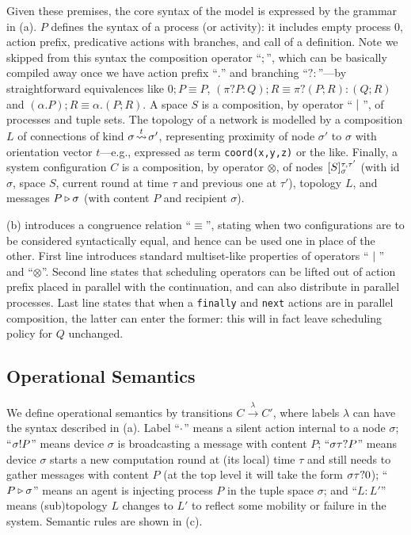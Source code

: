 \documentclass[12pt,a4paper,twoside,openright]{book}
\begin{document}
Given these premises, the core syntax of the model is expressed by the grammar in  (a). $P$ defines the syntax of a process (or activity): it includes empty process $0$, action prefix, predicative actions with branches, and call of a definition.
%
Note we skipped from this syntax the composition operator ``$;$'', which can be basically compiled away once we have action prefix ``$.$'' and branching ``$?:$''---by straightforward equivalences like $0;P\equiv P$, $(\pi?P:Q);R \equiv \pi?(P;R):(Q;R)$ and $(\alpha.P);R \equiv \alpha.(P;R)$.
%
A space $S$ is a composition, by operator ``$\opar$'', of processes and tuple sets.
%
The topology of a network is modelled by a composition $L$ of connections of kind $\near{\sigma}{\sigma'}{t}$, representing proximity of node $\sigma'$ to $\sigma$ with orientation vector $t$---e.g., expressed as term \texttt{coord(x,y,z)} or the like.
%
Finally, a system configuration $C$ is a composition, by operator $\otimes$, of nodes $\scope{S}{\sigma}{\tau,\tau'}$ (with id $\sigma$, space $S$, current round at time $\tau$ and previous one at $\tau'$), topology $L$, and messages $\mesg{P}{\sigma}$ (with content $P$ and recipient $\sigma$).

 (b) introduces a congruence relation ``$\equiv$'', stating when two configurations are to be considered syntactically equal, and hence can be used one in place of the other.
%
First line introduces standard multiset-like properties of operators ``$\opar$'' and ``$\otimes$''.
%
Second line states that scheduling operators can be lifted out of action prefix placed in parallel with the continuation, and can also distribute in parallel processes.
%
Last line states that when a \texttt{finally} and \texttt{next} actions are in parallel composition, the latter can enter the former: this will in fact leave scheduling policy for $Q$ unchanged.

\subsection{Operational Semantics}

We define operational semantics by transitions $C\xrightarrow{\lambda}C'$, where labels $\lambda$ can have the syntax described in  (a).
%
Label ``$\labsilent{\sigma}$'' means a silent action internal to a node $\sigma$; ``$\labmesg{\sigma}{P}$'' means device $\sigma$ is broadcasting a message with content $P$; ``$\labnew{\tau}{P}{\sigma}$'' means device $\sigma$ starts a new computation round at (its local) time $\tau$ and still needs to gather messages with content $P$ (at the top level it will take the form $\labnew{\tau}{0}{\sigma}$); ``$\mesg{P}{\sigma}$'' means an agent is injecting process $P$ in the tuple space $\sigma$; and ``$L:L'$'' means (sub)topology $L$ changes to $L'$ to reflect some mobility or failure in the system.
%
Semantic rules are shown in  (c).
\end{document}
